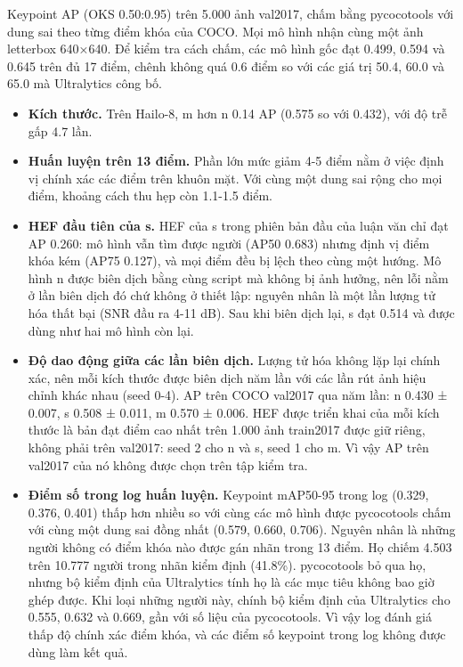 Keypoint AP (OKS 0.50:0.95) trên 5.000 ảnh val2017, chấm bằng pycocotools \cite{b15} với dung sai theo từng điểm khóa của COCO. Mọi mô hình nhận cùng một ảnh letterbox 640×640. Để kiểm tra cách chấm, các mô hình gốc đạt 0.499, 0.594 và 0.645 trên đủ 17 điểm, chênh không quá 0.6 điểm so với các giá trị 50.4, 60.0 và 65.0 mà Ultralytics công bố.

\begin{itemize}
\tightlist
\item
  \textbf{Kích thước.} Trên Hailo-8, m hơn n 0.14 AP (0.575 so với 0.432), với độ trễ gấp 4.7 lần.
\item
  \textbf{Huấn luyện trên 13 điểm.} Phần lớn mức giảm 4-5 điểm nằm ở việc định vị chính xác các điểm trên khuôn mặt. Với cùng một dung sai rộng cho mọi điểm, khoảng cách thu hẹp còn 1.1-1.5 điểm.
\item
  \textbf{HEF đầu tiên của s.} HEF của s trong phiên bản đầu của luận văn chỉ đạt AP 0.260: mô hình vẫn tìm được người (AP50 0.683) nhưng định vị điểm khóa kém (AP75 0.127), và mọi điểm đều bị lệch theo cùng một hướng. Mô hình n được biên dịch bằng cùng script mà không bị ảnh hưởng, nên lỗi nằm ở lần biên dịch đó chứ không ở thiết lập: nguyên nhân là một lần lượng tử hóa thất bại (SNR đầu ra 4-11 dB). Sau khi biên dịch lại, s đạt 0.514 và được dùng như hai mô hình còn lại.
\item
  \textbf{Độ dao động giữa các lần biên dịch.} Lượng tử hóa không lặp lại chính xác, nên mỗi kích thước được biên dịch năm lần với các lần rút ảnh hiệu chỉnh khác nhau (seed 0-4). AP trên COCO val2017 qua năm lần: n 0.430 ± 0.007, s 0.508 ± 0.011, m 0.570 ± 0.006. HEF được triển khai của mỗi kích thước là bản đạt điểm cao nhất trên 1.000 ảnh train2017 được giữ riêng, không phải trên val2017: seed 2 cho n và s, seed 1 cho m. Vì vậy AP trên val2017 của nó không được chọn trên tập kiểm tra.
\item
  \textbf{Điểm số trong log huấn luyện.} Keypoint mAP50-95 trong log (0.329, 0.376, 0.401) thấp hơn nhiều so với cùng các mô hình được pycocotools chấm với cùng một dung sai đồng nhất (0.579, 0.660, 0.706). Nguyên nhân là những người không có điểm khóa nào được gán nhãn trong 13 điểm. Họ chiếm 4.503 trên 10.777 người trong nhãn kiểm định (41.8\%). pycocotools bỏ qua họ, nhưng bộ kiểm định của Ultralytics tính họ là các mục tiêu không bao giờ ghép được. Khi loại những người này, chính bộ kiểm định của Ultralytics cho 0.555, 0.632 và 0.669, gần với số liệu của pycocotools. Vì vậy log đánh giá thấp độ chính xác điểm khóa, và các điểm số keypoint trong log không được dùng làm kết quả.
\end{itemize}

